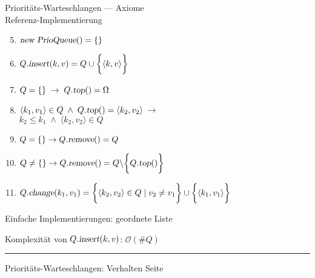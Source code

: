 \documentclass{slides}
\newcommand{\Oh}{\mathcal{O}}
\newcounter{mypage}
\def\pair(#1,#2){\langle #1, #2 \rangle}
\begin{document}
\begin{slide}{}
\normalsize

\begin{center}
Priorit\"ats-Warteschlangen --- Axiome \\[0.4cm]
Referenz-Implementierung
\end{center}
\vspace*{0.5cm}

\footnotesize
\begin{enumerate}
\setcounter{enumi}{4}

\item $\textsl{new PrioQueue}() = \{\}$
\item $Q.\textsl{insert}(k, v) = Q \cup \biggl\{ \pair(k,v) \biggr\}$
\item $Q = \{\} \;\rightarrow\; Q.\textsl{top}() = \Omega$
\item $\pair(k_1,v_1) \in Q \;\wedge\; Q.\textsl{top}() = \pair(k_2,v_2) \;\rightarrow\; $ \\[0.3cm]
      \hspace*{2cm} $k_2 \leq k_1 \;\wedge\; \pair(k_2,v_2) \in Q$
\item $Q = \{\} \rightarrow Q.\textsl{remove}() = Q$
\item $Q \not= \{\} \rightarrow Q.\textsl{remove}() = Q \backslash \biggl\{ Q.\textsl{top}() \biggr\}$
\item $Q.\textsl{change}(k_1,v_1) = 
       \biggl\{ \pair(k_2,v_2) \in Q \mid v_2 \not= v_1 \biggr\} \cup \biggl\{ \pair(k_1,v_1) \biggr\}$
\end{enumerate}

Einfache Implementierungen: \quad geordnete Liste

Komplexit\"at von $Q.\textsl{insert}(k,v)$: \quad $\Oh(\#Q)$

\vspace*{\fill}
\tiny \addtocounter{mypage}{1}
\rule{17cm}{1mm}
Priorit\"ats-Warteschlangen: Verhalten \hspace*{\fill} Seite 
\end{slide}

\end{document}
